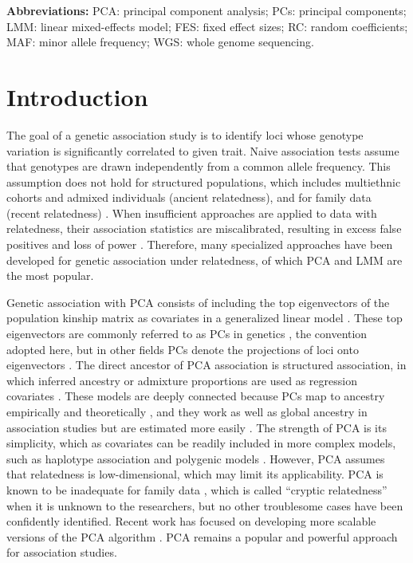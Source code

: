 \documentclass[11pt]{article}
\begin{document}
\textbf{Abbreviations:}
PCA: principal component analysis;
PCs: principal components;
LMM: linear mixed-effects model;
FES: fixed effect sizes;
RC: random coefficients;
MAF: minor allele frequency;
WGS: whole genome sequencing.

\section{Introduction} 

The goal of a genetic association study is to identify loci whose genotype variation is significantly correlated to given trait.
Naive association tests assume that genotypes are drawn independently from a common allele frequency.
This assumption does not hold for structured populations, which includes multiethnic cohorts and admixed individuals (ancient relatedness), and for family data (recent relatedness) \citep{astle_population_2009}.
When insufficient approaches are applied to data with relatedness, their association statistics are miscalibrated, resulting in excess false positives and loss of power \citep{devlin_genomic_1999, voight_confounding_2005, astle_population_2009}.
Therefore, many specialized approaches have been developed for genetic association under relatedness, of which PCA and LMM are the most popular.

Genetic association with PCA consists of including the top eigenvectors of the population kinship matrix as covariates in a generalized linear model \citep{zhang_semiparametric_2003, price_principal_2006, bouaziz_accounting_2011}.
These top eigenvectors are commonly referred to as PCs in genetics \citep{patterson_population_2006}, the convention adopted here, but in other fields PCs denote the projections of loci onto eigenvectors \citep{jolliffe_principal_2002}.
The direct ancestor of PCA association is structured association, in which inferred ancestry or admixture proportions are used as regression covariates \citep{pritchard_association_2000}.
These models are deeply connected because PCs map to ancestry empirically \citep{alexander_fast_2009, zhou_strong_2016} and theoretically \citep{mcvean_genealogical_2009,zheng_eigenanalysis_2016,cabreros_likelihood-free_2019,chiu_inferring_2022}, and they work as well as global ancestry in association studies but are estimated more easily \citep{patterson_population_2006, zhao_arabidopsis_2007, alexander_fast_2009, bouaziz_accounting_2011}.
The strength of PCA is its simplicity, which as covariates can be readily included in more complex models, such as haplotype association \citep{xu_detecting_2014} and polygenic models \citep{qian_fast_2020}.
However, PCA assumes that relatedness is low-dimensional, which may limit its applicability.
PCA is known to be inadequate for family data \citep{patterson_population_2006, thornton_roadtrips:_2010, price_new_2010}, which is called ``cryptic relatedness'' when it is unknown to the researchers, but no other troublesome cases have been confidently identified.
Recent work has focused on developing more scalable versions of the PCA algorithm \citep{lee_sparse_2012, abraham_fast_2014, galinsky_fast_2016, abraham_flashpca2:_2017, agrawal_scalable_2020}.
PCA remains a popular and powerful approach for association studies.
\end{document}
